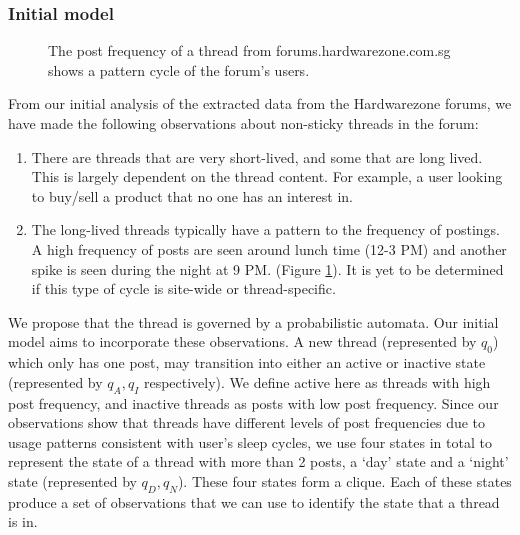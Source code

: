 \documentclass[12 pt]{article}
\begin{document}
\subsubsection{Initial model}
\begin{figure}\label{sleepcycle}
\caption{The post frequency of a thread from forums.hardwarezone.com.sg shows a pattern cycle of the forum's users.}
\end{figure}
From our initial analysis of the extracted data from the Hardwarezone forums, we have made the following observations about non-sticky threads in the forum:
\begin{enumerate}
	\item There are threads that are very short-lived, and some that are long lived. This is largely dependent on the thread content. For example, a user looking to buy/sell a product that no one has an interest in.
	\item The long-lived threads typically have a pattern to the frequency of postings. A high frequency of posts are seen around lunch time (12-3 PM) and another spike is seen during the night at 9 PM. (Figure \ref{sleepcycle}). It is yet to be determined if this type of cycle is site-wide or thread-specific.
\end{enumerate}
We propose that the thread is governed by a probabilistic automata. Our initial model aims to incorporate these observations. A new thread (represented by $q_0$) which only has one post, may transition into either an active or inactive state (represented by $q_A,q_I$ respectively). We define active here as threads with high post frequency, and inactive threads as posts with low post frequency. Since our observations show that threads have different levels of post frequencies due to usage patterns consistent with user's sleep cycles, we use four states in total to represent the state of a thread with more than 2 posts, a `day' state and a `night' state (represented by $q_D,q_N$). These four states form a clique. Each of these states produce a set of observations that we can use to identify the state that a thread is in.
\end{document}
